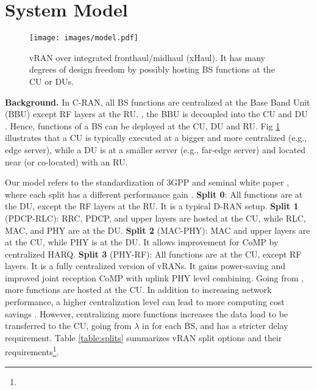 \section{System Model} \label{sec:model}

\begin{figure}[t!]
	\centering
	\texttt{[image: images/model.pdf]}   
	\caption{\small vRAN over integrated fronthaul/midhaul (xHaul). It has many degrees of design freedom by possibly hosting BS functions at the CU or DUs.}
	\label{fig:vran}
	\vspace{-3mm}
\end{figure}

\textbf{Background.} In C-RAN, all BS functions are centralized at the Base Band Unit (BBU) except RF layers at the RU.  , the BBU is decoupled into the CU and DU \cite{split_3gpp_rel16}. Hence, functions of a BS can be deployed at the CU, DU and RU. Fig \ref{fig:vran} illustrates that a CU is typically executed at a bigger and more centralized  (e.g., edge server), while a DU is at a smaller server (e.g., far-edge server) and located near (or co-located) with an RU.

Our model refers to the standardization of 3GPP \cite{split_3gpp,split_3gpp_rel16} and seminal white paper \cite{smallcell}, where each split has a different performance gain \cite{vran_murti2,function_split_survey}. 
 \textbf{Split 0}: All functions are at the DU, except the RF layers at the RU. It is a typical D-RAN setup. \textbf{Split 1} (PDCP-RLC): RRC, PDCP, and upper layers are hosted at the CU, while RLC, MAC, and PHY are at the DU.  \textbf{Split 2} (MAC-PHY): MAC and upper layers are at the CU, while PHY is at the DU. It allows improvement for CoMP by centralized HARQ. \textbf{Split 3} (PHY-RF): All functions are at the CU, except RF layers. It is a fully centralized version of vRANs. It gains power-saving and improved joint reception CoMP with uplink PHY level combining. Going from , more functions are hosted at the CU. In addition to increasing network performance, a higher centralization level can lead to more computing cost savings \cite{vran_murti2}. However, centralizing more functions increases the data load to be transferred to the CU, going from $\lambda$ in  for each BS, and has a stricter delay requirement. Table \ref{table:splits} summarizes vRAN split options and their requirements\footnote{ }.  

